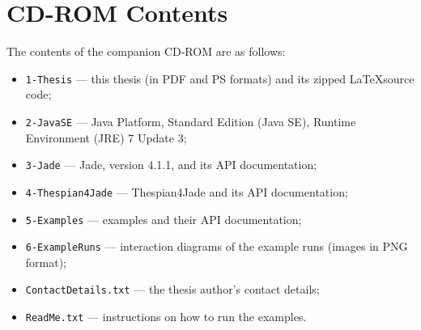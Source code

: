 
\chapter{CD-ROM Contents}

The contents of the companion CD-ROM are as follows:
\begin{itemize}
	\item \texttt{1-Thesis} --- this thesis (in PDF and PS formats) and its zipped \LaTeX source code;
	\item \texttt{2-JavaSE} --- Java Platform, Standard Edition (Java SE), Runtime Environment (JRE) 7 Update 3;
	\item \texttt{3-Jade} --- Jade, version 4.1.1, and its API documentation;
	\item \texttt{4-Thespian4Jade} --- Thespian4Jade and its API documentation;
	\item \texttt{5-Examples} --- examples and their API documentation;
	\item \texttt{6-ExampleRuns} --- interaction diagrams of the example runs (images in PNG format);
	\item \texttt{ContactDetails.txt} --- the thesis author's contact details;
	\item \texttt{ReadMe.txt} --- instructions on how to run the examples.
\end{itemize}